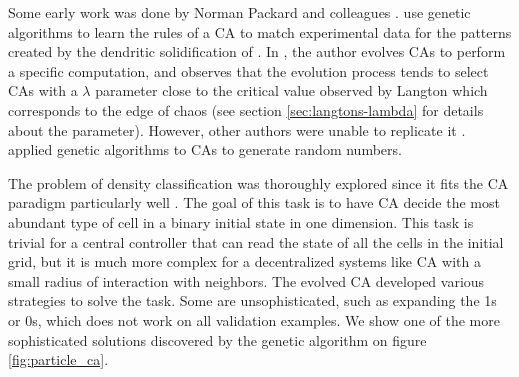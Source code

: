 Some early work was done by Norman Packard and colleagues
\parencite{packardAdaptationEdgeChaos1988,
  richardsExtractingCellularAutomaton1990}.
\textcite{richardsExtractingCellularAutomaton1990} use genetic algorithms to
learn the rules of a \ac{CA} to match experimental data for the patterns created
by the dendritic solidification of . In
\parencite{packardAdaptationEdgeChaos1988}, the author evolves \acp{CA} to
perform a specific computation, and observes that the evolution process tends to
select \acp{CA} with a $\lambda$ parameter close to the critical value observed
by Langton which corresponds to the edge of chaos (see section
\ref{sec:langtons-lambda} for details about the parameter). However, other
authors were unable to replicate it \parencite{mitchellRevisitingEdgeChaos1993}.
\textcite{kozaEvolutionSubsumptionUsing1992} applied genetic algorithms to
\acp{CA} to generate random numbers.

The problem of density classification was thoroughly explored since it fits the
\ac{CA} paradigm particularly well \parencite{mitchellRevisitingEdgeChaos1993,
  mitchellEvolvingCellularAutomata1994,
  crutchfieldEvolutionEmergentComputation1995, dasGeneticAlgorithmDiscovers1994,
  sipperCoevolvingNonuniformCellular1996, andreDiscoveryGeneticProgramming1996}.
The goal of this task is to have \ac{CA} decide the most abundant type of cell
in a binary initial state in one dimension. This task is trivial for a central
controller that can read the state of all the cells in the initial grid, but it
is much more complex for a decentralized systems like \ac{CA} with a small
radius of interaction with neighbors. The evolved \ac{CA} developed various
strategies to solve the task. Some are unsophisticated, such as expanding the 1s
or 0s, which does not work on all validation examples. We show one of the more
sophisticated solutions discovered by the genetic algorithm on figure
\ref{fig:particle_ca}.

